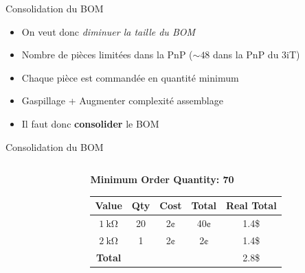 \begin{frame}{Consolidation du BOM}
    \begin{itemize}
        \item On veut donc \textit{diminuer la taille du BOM}
        \item Nombre de pièces limitées dans la PnP ($\sim 48$ dans la PnP du 3iT)
        \item Chaque pièce est commandée en quantité minimum
        \item Gaspillage + Augmenter complexité assemblage
        \bigskip
        \item Il faut donc \textbf{consolider} le BOM
    \end{itemize}
\end{frame}

\begin{frame}{Consolidation du BOM}
    \begin{columns}
        \begin{column}{0.05\textwidth}
        \end{column}
        \begin{column}{0.5\textwidth}
            \begin{centering}
            \textbf{Minimum Order Quantity: 70}\\
            \end{centering}
            \vspace{12pt}
            \begin{tabular}{c | c | c | c | c}
                \textbf{Value} & \textbf{Qty} & \textbf{Cost} & \textbf{Total} & \textbf{Real Total}\\
                \hline
                $\SI{1}{\kilo\ohm}$ & 20 & 2¢ & 40¢ & 1.4\$\\
                $\SI{2}{\kilo\ohm}$ & 1  & 2¢ & 2¢  & 1.4\$\\
                \textbf{Total}      &    &    &     & 2.8\$
            \end{tabular}

            \vspace{24pt}



\end{column}
\end{columns}
\end{frame}
